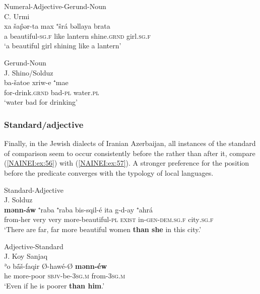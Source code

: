 \documentclass[output=paper,colorlinks,citecolor=brown,draftmode]{langscibook}
\begin{document}
\ea\label{NAINEI:ex:54}
Numeral-Adjective-Gerund-Noun\\
C. Urmi \citep[A56:\S 1]{Khan2016CUrmi} \\
\gll xa šap̂ər-ta max ⁺šrá bəllaya brata \\
     a beautiful\textsc{-sg.f} like lantern shine\textsc{.grnd} girl\textsc{.sg.f} \\
\glt `a beautiful girl shining like a lantern'
\z

\ea\label{NAINEI:ex:55}
Gerund-Noun\\
J. Shino/Solduz \citep[84]{Garbell1065a} \\
\gll ba-šatoe xriw-e ⁺mae \\
     for-drink\textsc{.grnd} bad\textsc{-pl} water\textsc{.pl} \\
\glt `water bad for drinking'
\z

\subsubsection{Standard/adjective}
Finally, in the Jewish dialects of Iranian Azerbaijan, all instances of the standard of comparison seem to occur consistently before the  rather than after it, compare (\ref{NAINEI:ex:56}) with (\ref{NAINEI:ex:57}). A stronger preference for the position before the predicate converges with the typology of local  languages.

\ea\label{NAINEI:ex:56}
Standard-Adjective\\
J. Solduz \citep[211.19]{Garbell1065a} \\
\gll \textbf{mənn-áw} ⁺raba ⁺raba bis-sqil-é ita g-d-ay ⁺ahrá \\
     from-her very very more-beautiful\textsc{-pl} \textsc{exist} in\textsc{-gen-dem.sg.f} city\textsc{.sg.f} \\
\glt `There are far, far more beautiful women \textbf{than she} in this city.'
\z

\ea\label{NAINEI:ex:57}
Adjective-Standard\\
J. Koy Sanjaq \citep[1B:\S 24]{Mutzafi2004Koya} \\
\gll ʾo bā́š-faqir Ø-hawé-Ø \textbf{mənn-éw} \\
     he more-poor \textsc{sbjv-}be\textsc{-3sg.m} from\textsc{-3sg.m} \\
\glt `Even if he is poorer \textbf{than him}.'
\z
\end{document}
